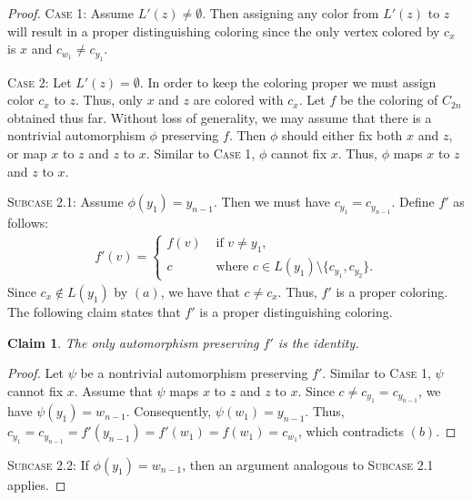 \documentclass[12pt,reqno,a4paper]{amsart}
\theoremstyle{definition}
\newtheorem{claim}[defn]{Claim}
\begin{document}
\begin{proof}
\textsc{Case 1:} Assume $L'(z)\neq \emptyset$. Then assigning any color from $L'(z)$ to $z$ will result in a proper distinguishing coloring since the only vertex colored by $c_x$ is $x$ and $c_{w_{1}}\neq c_{y_{1}}$. 

\textsc{Case 2:} Let $L'(z)= \emptyset$. In order to keep the coloring proper we must assign color $c_x$ to $z$.
Thus, only $x$ and $z$ are colored with $c_{x}$.
Let $f$ be the coloring of $C_{2n}$ obtained thus far.
Without loss of generality, we may assume that there is a nontrivial automorphism $\phi$ preserving $f$.  
Then $\phi$ should either fix both $x$ and $z$, or map $x$ to $z$ and $z$ to $x$.
Similar to \textsc{Case 1}, $\phi$ cannot fix $x$. Thus, $\phi$ maps $x$ to $z$ and $z$ to $x$.


\textsc{Subcase 2.1:} Assume $\phi(y_{1})=y_{n-1}$. Then we must have
$c_{y_{1}} = c_{y_{n-1}}$.
Define $f'$ as follows:
\begin{align}\tag{$\ast$}
    f'(v) = \begin{cases}
        f(v) & \text{ if } v\neq y_{1},\\
        c & \text{ where } c\in L(y_{1})\setminus\{c_{y_{1}}, c_{y_{2}}\}.
    \end{cases}
\end{align}
Since $c_{x}\not\in L(y_{1})$ by $(a)$, we have that $c\neq c_{x}$. Thus, $f'$ is a proper coloring.
The following claim states that $f'$ is a proper distinguishing coloring.

\begin{claim}\label{Claim 2.6}
{\em The only automorphism preserving $f'$ is the identity.}
\end{claim}
\begin{proof}
Let $\psi$ be a nontrivial automorphism preserving $f'$. Similar to \textsc{Case 1}, $\psi$ cannot fix $x$.
Assume that $\psi$ maps $x$ to $z$ and $z$ to $x$. Since $c \neq c_{y_{1}}=c_{y_{n-1}}$, we have $\psi(y_{1})=w_{n-1}$. Consequently, $\psi(w_{1})=y_{n-1}$. Thus,
$c_{y_{1}}= c_{y_{n-1}} = f'(y_{n-1})= f'(w_{1}) = f(w_{1})= c_{w_{1}}$,
which contradicts $(b)$.
\end{proof}

\textsc{Subcase 2.2:} If $\phi(y_{1})=w_{n-1}$, then an argument analogous to \textsc{Subcase 2.1} applies.
\end{proof}
\end{document}
